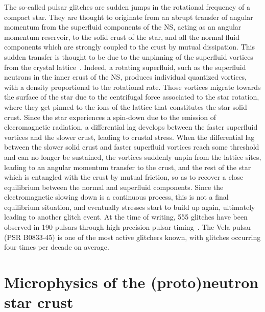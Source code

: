 The so-called pulsar glitches are sudden jumps in the rotational frequency of 
a compact star. They are thought to originate from an abrupt transfer of 
angular momentum from the superfluid components of the NS, acting as an angular 
momentum reservoir, to the solid crust of the star, and all the normal fluid
components which are strongly coupled to the crust by mutual dissipation. This
sudden transfer is thought to be due to the unpinning of the superfluid 
vortices from the crystal lattice~\cite{Anderson1975}. 
%
Indeed, a rotating superfluid, such as the superfluid neutrons in the inner 
crust of the NS, produces individual quantized vortices, with a density 
proportional to the rotational rate. Those vortices migrate towards the surface 
of the star due to the centrifugal force associated to the star rotation, where 
they get pinned to the ions of the lattice that constitutes the star solid 
crust. Since the star experiences a spin-down due to the emission of 
elecromagnetic radiation, a differential lag develops between the faster 
superfluid vortices and the slower crust, leading to crustal stress. 
%
When the differential lag between the slower solid crust and faster superfluid 
vortices reach some threshold and can no longer be sustained, the vortices
suddenly unpin from the lattice sites, leading to an angular momentum transfer
to the crust, and the rest of the star which is entangled with the crust by
mutual friction, so as to recover a close equilibrium between the normal and
superfluid components. Since the electromagnetic slowing down is a continuous
process, this is not a final equilibrium situation, and eventually stresses 
start to build up again, ultimately leading to another glitch event.
%
At the time of writing, 555 glitches have been observed in 190 pulsars through 
high-precision pulsar timing~\cite{Espinoza2011,Glitches}. The Vela pulsar 
(PSR B0833-45) is one of the most active glitchers known, with glitches 
occurring four times per decade on average.

\section*{Microphysics of the (proto)neutron star crust}

